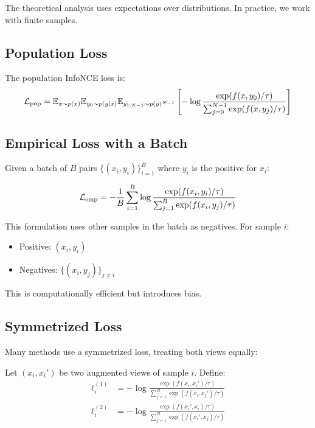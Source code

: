 \begin{notechapter}
The theoretical analysis uses expectations over distributions. In practice, we work with finite samples.

\subsection{Population Loss}

The population InfoNCE loss is:
\begin{equation}
\mathcal{L}_{\text{pop}} = \mathbb{E}_{x \sim p(x)} \mathbb{E}_{y_0 \sim p(y|x)} \mathbb{E}_{y_{1:N-1} \sim p(y)^{N-1}} \left[-\log \frac{\exp(f(x,y_0)/\tau)}{\sum_{j=0}^{N-1} \exp(f(x,y_j)/\tau)}\right]
\end{equation}

\subsection{Empirical Loss with a Batch}

Given a batch of $B$ pairs $\{(x_i, y_i)\}_{i=1}^B$ where $y_i$ is the positive for $x_i$:

\begin{definition}
\begin{equation}
\mathcal{L}_{\text{emp}} = -\frac{1}{B} \sum_{i=1}^{B} \log \frac{\exp(f(x_i, y_i)/\tau)}{\sum_{j=1}^{B} \exp(f(x_i, y_j)/\tau)}
\end{equation}
\end{definition}

\begin{remark}
This formulation uses other samples in the batch as negatives. For sample $i$:
\begin{itemize}
    \item Positive: $(x_i, y_i)$
    \item Negatives: $\{(x_i, y_j)\}_{j \neq i}$
\end{itemize}
This is computationally efficient but introduces bias.
\end{remark}

\subsection{Symmetrized Loss}

Many methods use a symmetrized loss, treating both views equally:

\begin{definition}
Let $(x_i, x_i')$ be two augmented views of sample $i$. Define:
\begin{align}
\ell_i^{(1)} &= -\log \frac{\exp(f(x_i, x_i')/\tau)}{\sum_{j=1}^{B} \exp(f(x_i, x_j')/\tau)} \\
\ell_i^{(2)} &= -\log \frac{\exp(f(x_i', x_i)/\tau)}{\sum_{j=1}^{B} \exp(f(x_i', x_j)/\tau)}
\end{align}


\end{definition}
\end{notechapter}
